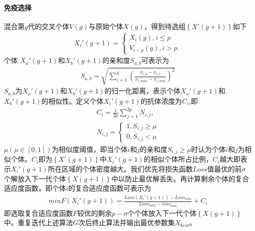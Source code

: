 \documentclass{whutmod}
\begin{document}
	    \paragraph{免疫选择}
	    混合第$g$代的交叉个体$V(g)$与原始个体$X(g)$，得到待选组$\left \{ X '(g+1)\right \}$如下
	    \begin{gather*}
	    X_i '(g+1)=\left\{\begin{matrix}  X_i (g),i\leqslant p
	    \\  V_{i-p} (g),i>p.
	    \end{matrix}\right.
	    \end{gather*}
		个体 $X_a '(g+1)$和$X_b '(g+1)$的亲和度$S_{a,b}$可表示为
		\begin{gather}
		S_{a,b}=\sqrt{\sum _{i=1}^4( \frac{x_{i,a}-x_{i,b}}{x_{i,max}-x_{i,min}})^2}
		\end{gather}
		$S_{a,b}$为$X_a '(g+1)$和$X_b '(g+1)$的归一化距离，表示个体$X_a '(g+1)$和$X_b '(g+1)$的相似性。定义个体$X_i '(g+1)$的抗体浓度为$C_{i}$,即
		\begin{gather}
		C_{i}=\frac{1}{2p}\sum _{j=1}^{2p} N_{i,j},\\
		N_{i,j}=\left\{\begin{matrix}1,S_{i,j}\geqslant \mu 
		\\ 0,S_{i,j}< \mu 
		\end{matrix}\right.
		\end{gather}
		$\mu(\mu\in[0,1])$为相似度阈值，即当个体$i$和$j$的亲和度$S_{i,j}\geqslant \mu$时认为个体$i$和$j$为相似个体。$C_{i}$即为$\left \{ X '(g+1)\right \}$中$X_i '(g+1)$的相似个体所占比例，$C_{i}$越大即表示$X_i '(g+1)$所在区域的个体密度越大。我们优先将损失函数$Loss$值最优的前$\sigma$个解放入下一代个体$\left \{ X(g+1)\right \}$中以防止最优解丢失。再计算剩余个体的复合适应度函数，即个体$i$的复合适应度函数可表示为
	    \begin{gather}
	  min F(X_i '(g+1))=\frac{Loss(X_i '(g+1))-Loss_{min}}{Loss_{max}-loss_{min}}+C_{i}
		\end{gather}
		即选取复合适应度函数$F$较优的剩余$p-\sigma$个个体放入下一代个体$\left \{ X(g+1)\right \}$中。重复迭代上述算法$G$次后终止算法并输出最优参数集$X_{best}$。
		
		
		
\end{document}

